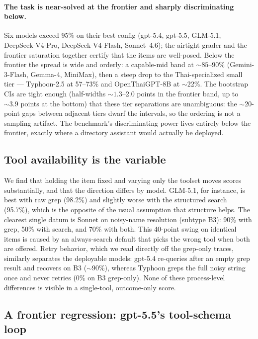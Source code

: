 \documentclass[11pt]{article}
\begin{document}
\paragraph{The task is near-solved at the frontier and sharply discriminating below.} Six models exceed
95\% on their best config (gpt-5.4, gpt-5.5, GLM-5.1, DeepSeek-V4-Pro, DeepSeek-V4-Flash, Sonnet~4.6);
the airtight grader and the frontier saturation together certify that the items are well-posed. Below
the frontier the spread is wide and orderly: a capable-mid band at ${\sim}85$--90\% (Gemini-3-Flash,
Gemma-4, MiniMax), then a steep drop to the Thai-specialized small tier --- Typhoon-2.5 at 57--73\% and
OpenThaiGPT-8B at ${\sim}22$\%. The bootstrap CIs are tight enough (half-widths ${\sim}1.3$--2.0 points
in the frontier band, up to ${\sim}3.9$ points at the bottom) that these tier separations are
unambiguous: the ${\sim}20$-point gaps between adjacent tiers dwarf the intervals, so the ordering is
not a sampling artifact. The benchmark's discriminating power lives entirely below the frontier, exactly
where a directory assistant would actually be deployed.

\subsection{Tool availability is the variable}

We find that holding the item fixed and varying only the toolset moves scores substantially, and that
the direction differs by model. GLM-5.1, for instance, is best with raw grep (98.2\%) and slightly
worse with the structured search (95.7\%), which is the opposite of the usual assumption that structure
helps. The clearest single datum is Sonnet on noisy-name resolution (subtype B3): 90\% with grep, 50\%
with search, and 70\% with both. This 40-point swing on identical items is caused by an always-search
default that picks the wrong tool when both are offered. Retry behavior, which we read directly off the
grep-only traces, similarly separates the deployable models: gpt-5.4 re-queries after an empty grep
result and recovers on B3 (${\sim}90$\%), whereas Typhoon greps the full noisy string once and never
retries (0\% on B3 grep-only). None of these process-level differences is visible in a single-tool,
outcome-only score.

\subsection{A frontier regression: gpt-5.5's tool-schema loop}
\label{sec:regression}
\end{document}
